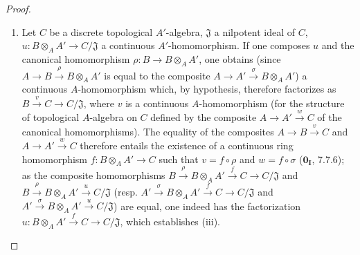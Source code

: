 \begin{proof}
\begin{enumerate}
  \item[(iii)] Let $C$ be a discrete topological $A'$-algebra,
  $\mathfrak{J}$ a nilpotent ideal of $C$,
  $u:B\otimes_A A'\to C/\mathfrak{J}$ a continuous $A'$-homomorphism. If one
  composes $u$ and the canonical homomorphism $\rho:B\to B\otimes_A A'$, one
  obtains (since $A\to B\xrightarrow{\rho}B\otimes_A A'$ is equal to the
  composite $A\to A'\xrightarrow{\sigma}B\otimes_A A'$) a continuous
  $A$-homomorphism which, by hypothesis, therefore factorizes as
  $B\xrightarrow{v}C\to C/\mathfrak{J}$, where $v$ is a continuous
  $A$-homomorphism (for the structure of topological $A$-algebra on $C$
  defined by the composite $A\to A'\xrightarrow{w}C$ of the canonical
  homomorphisms). The equality of the composites $A\to B\xrightarrow{v}C$ and
  $A\to A'\xrightarrow{w}C$ therefore entails the existence of a continuous
  ring homomorphism $f:B\otimes_A A'\to C$ such that $v=f\circ\rho$ and
  $w=f\circ\sigma$ ($\mathbf{0_I}$, 7.7.6); as the composite homomorphisms
  $B\xrightarrow{\rho}B\otimes_A A'\xrightarrow{f}C\to C/\mathfrak{J}$
  and
  $B\xrightarrow{\rho}B\otimes_A A'\xrightarrow{u}C/\mathfrak{J}$
  (resp.
  $A'\xrightarrow{\sigma}B\otimes_A A'\xrightarrow{f}C\to C/\mathfrak{J}$
  and
  $A'\xrightarrow{\sigma}B\otimes_A A'\xrightarrow{u}C/\mathfrak{J}$)
  are equal, one indeed has the factorization
  $u:B\otimes_A A'\xrightarrow{f}C\to C/\mathfrak{J}$, which establishes
  (iii).


\end{enumerate}
\end{proof}
